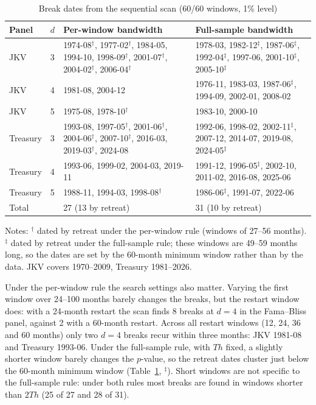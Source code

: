 \documentclass[11pt]{article}
\begin{document}
\begin{table}[htbp]
\centering
\small
\begin{threeparttable}
\caption{Break dates from the sequential scan (60/60 windows, 1\% level)}\label{tab.breaks}
\begin{tabular}{llp{5.6cm}p{5.6cm}}
\toprule
Panel & $d$ & Per-window bandwidth & Full-sample bandwidth\\
\midrule
JKV & 3 & 1974-08$^\dagger$, 1977-02$^\dagger$, 1984-05, 1994-10, 1998-09$^\dagger$, 2001-07$^\dagger$, 2004-02$^\dagger$, 2006-04$^\dagger$ & 1978-03, 1982-12$^\ddagger$, 1987-06$^\ddagger$, 1992-04$^\ddagger$, 1997-06, 2001-10$^\ddagger$, 2005-10$^\ddagger$\\
JKV & 4 & 1981-08, 2004-12 & 1976-11, 1983-03, 1987-06$^\ddagger$, 1994-09, 2002-01, 2008-02\\
JKV & 5 & 1975-08, 1978-10$^\dagger$ & 1983-10, 2000-10\\[3pt]
Treasury & 3 & 1993-08, 1997-05$^\dagger$, 2001-06$^\dagger$, 2004-06$^\dagger$, 2007-10$^\dagger$, 2016-03, 2019-03$^\dagger$, 2024-08 & 1992-06, 1998-02, 2002-11$^\ddagger$, 2007-12, 2014-07, 2019-08, 2024-05$^\ddagger$\\
Treasury & 4 & 1993-06, 1999-02, 2004-03, 2019-11 & 1991-12, 1996-05$^\ddagger$, 2002-10, 2011-02, 2016-08, 2025-06\\
Treasury & 5 & 1988-11, 1994-03, 1998-08$^\dagger$ & 1986-06$^\ddagger$, 1991-07, 2022-06\\
\midrule
Total & & 27 (13 by retreat) & 31 (10 by retreat)\\
\bottomrule
\end{tabular}
\begin{tablenotes}\small
\item Notes: $^\dagger$ dated by retreat under the per-window rule (windows of 27--56 months). $^\ddagger$ dated by retreat under the full-sample rule; these windows are 49--59 months long, so the dates are set by the 60-month minimum window rather than by the data. JKV covers 1970--2009, Treasury 1981--2026.
\end{tablenotes}
\end{threeparttable}
\end{table}

Under the per-window rule the search settings also matter. Varying the first window over 24--100 months barely changes the breaks, but the restart window does: with a 24-month restart the scan finds 8 breaks at $d=4$ in the Fama--Bliss panel, against 2 with a 60-month restart. Across all restart windows (12, 24, 36 and 60 months) only two $d=4$ breaks recur within three months: JKV 1981-08 and Treasury 1993-06. Under the full-sample rule, with $Th$ fixed, a slightly shorter window barely changes the $p$-value, so the retreat dates cluster just below the 60-month minimum window (Table~\ref{tab.breaks}, $^\ddagger$). Short windows are not specific to the full-sample rule: under both rules most breaks are found in windows shorter than $2Th$ (25 of 27 and 28 of 31).
\end{document}
